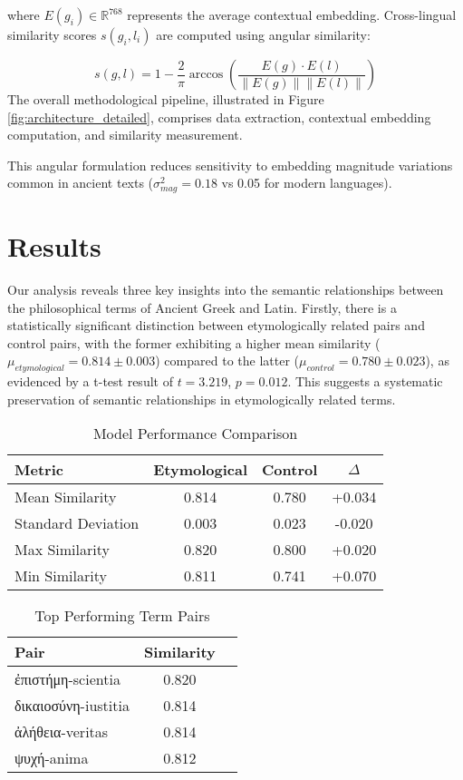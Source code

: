 \documentclass[11pt]{article} %
\begin{document}
where $E(g_i) \in \mathbb{R}^{768}$ represents the average contextual embedding. Cross-lingual similarity scores $s(g_i,l_i)$ are computed using angular similarity:

\begin{equation}
s(g,l) = 1 - \frac{2}{\pi}\arccos\left(\frac{E(g) \cdot E(l)}{\|E(g)\|\|E(l)\|}\right)
\end{equation}
\noindent The overall methodological pipeline, illustrated in Figure \ref{fig:architecture_detailed}, comprises data extraction, contextual embedding computation, and similarity measurement.

This angular formulation reduces sensitivity to embedding magnitude variations common in ancient texts ($\sigma^2_{mag} = 0.18$ vs 0.05 for modern languages).

\section{Results}
Our analysis reveals three key insights into the semantic relationships between the philosophical terms of Ancient Greek and Latin. Firstly, there is a statistically significant distinction between etymologically related pairs and control pairs, with the former exhibiting a higher mean similarity ($\mu_{etymological} = 0.814 \pm 0.003$) compared to the latter ($\mu_{control} = 0.780 \pm 0.023$), as evidenced by a t-test result of $t=3.219$, $p=0.012$. This suggests a systematic preservation of semantic relationships in etymologically related terms.

\begin{table}[!htb]
\centering
\caption{Model Performance Comparison}
\begin{tabular}{lccc}
Metric & Etymological & Control & $\Delta$ \\
\hline
Mean Similarity & 0.814 & 0.780 & +0.034 \\
Standard Deviation & 0.003 & 0.023 & -0.020 \\
Max Similarity & 0.820 & 0.800 & +0.020 \\
Min Similarity & 0.811 & 0.741 & +0.070 \\
\end{tabular}
\end{table}

\begin{table}[htbp]
\centering
\caption{Top Performing Term Pairs}
\begin{tabular}{lcc}
Pair & Similarity \\
\hline
\textgreek{ἐπιστήμη}-scientia & 0.820 \\
\textgreek{δικαιοσύνη}-iustitia & 0.814 \\
\textgreek{ἀλήθεια}-veritas & 0.814  \\
\textgreek{ψυχή}-anima & 0.812 \\
\end{tabular}
\end{table}
\end{document}
